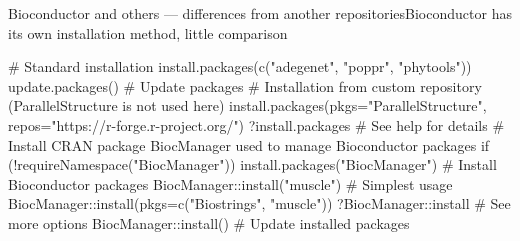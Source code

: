 \documentclass[compress, xelatex, 11pt, xcolor=svgnames, aspectratio=169,
	hyperref={
		bookmarks=true,
		unicode=true,
		colorlinks=true,
		pdftitle={Molecular data in R},
		plainpages=false,
		pdfauthor={Vojtech Zeisek},
		pdfsubject={Course about phylogeny and evolution in R},
		pdfcreator={XeLaTeX},
		pdfkeywords={R, evolution, phylogeny, molecular data},
		linkcolor=Crimson, %
		anchorcolor=Magenta, %
		citecolor=Magenta, %
		filecolor=Magenta, %
		menucolor=Magenta, %
		urlcolor=DodgerBlue, %
		},
	url={hyphens, lowtilde} %
	]{beamer}
\begin{document}
\begin{frame}[fragile]{Bioconductor and others --- differences from another repositories}{Bioconductor has its own installation method, little comparison}
	\label{sources-diff}
	\begin{spluscode}
    # Standard installation
    install.packages(c("adegenet", "poppr", "phytools"))
    update.packages() # Update packages
    # Installation from custom repository (ParallelStructure is not used here)
    install.packages(pkgs="ParallelStructure",
      repos="https://r-forge.r-project.org/")
    ?install.packages # See help for details
    # Install CRAN package BiocManager used to manage Bioconductor packages
    if (!requireNamespace("BiocManager")) install.packages("BiocManager")
    # Install Bioconductor packages
    BiocManager::install("muscle") # Simplest usage
    BiocManager::install(pkgs=c("Biostrings", "muscle"))
    ?BiocManager::install # See more options
    BiocManager::install() # Update installed packages
	\end{spluscode}
\end{frame}
\end{document}
